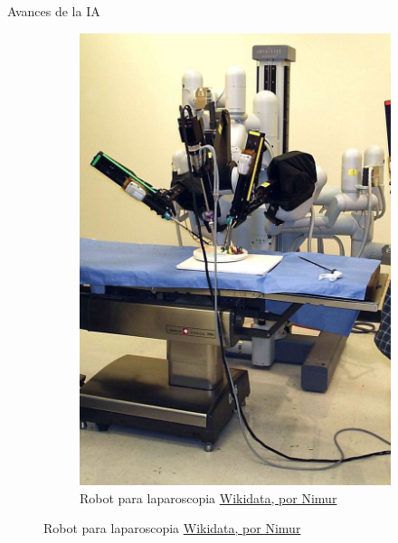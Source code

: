 \begin{frame}[fragile]{Avances de la IA}
\begin{figure}
\begin{subfigure}{0.45\textwidth}
		\includegraphics[scale=0.07]{./EtapaModerna/Imagenes/robot_surgery.jpg}
		\caption{Robot para laparoscopia \href{https://es.m.wikipedia.org/wiki/Archivo:Laproscopic_Surgery_Robot.jpg}{Wikidata, por Nimur}}
	\end{subfigure}
\end{figure}
\end{frame}


